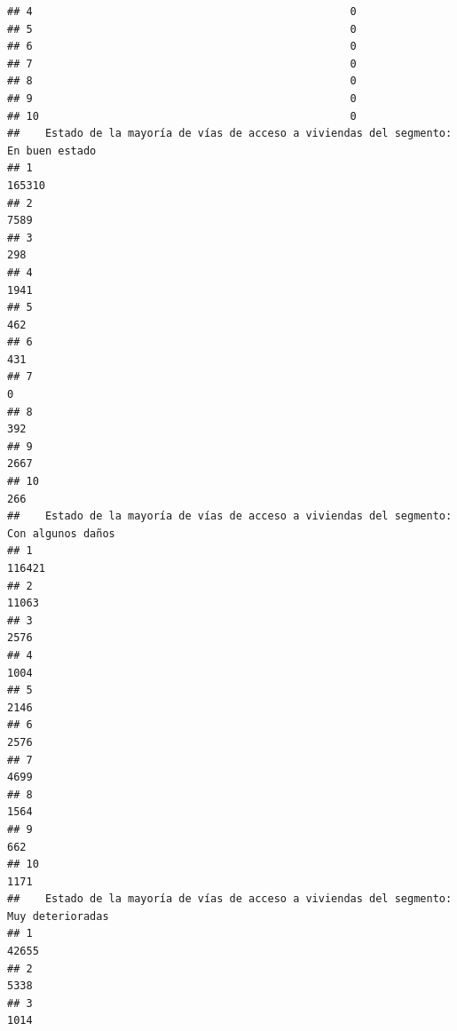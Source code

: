 \documentclass[11pt,]{article}
\begin{document}
\begin{verbatim}
## 4                                                  0
## 5                                                  0
## 6                                                  0
## 7                                                  0
## 8                                                  0
## 9                                                  0
## 10                                                 0
##    Estado de la mayoría de vías de acceso a viviendas del segmento: En buen estado
## 1                                                                           165310
## 2                                                                             7589
## 3                                                                              298
## 4                                                                             1941
## 5                                                                              462
## 6                                                                              431
## 7                                                                                0
## 8                                                                              392
## 9                                                                             2667
## 10                                                                             266
##    Estado de la mayoría de vías de acceso a viviendas del segmento: Con algunos daños
## 1                                                                              116421
## 2                                                                               11063
## 3                                                                                2576
## 4                                                                                1004
## 5                                                                                2146
## 6                                                                                2576
## 7                                                                                4699
## 8                                                                                1564
## 9                                                                                 662
## 10                                                                               1171
##    Estado de la mayoría de vías de acceso a viviendas del segmento: Muy deterioradas
## 1                                                                              42655
## 2                                                                               5338
## 3                                                                               1014

\end{verbatim}
\end{document}
